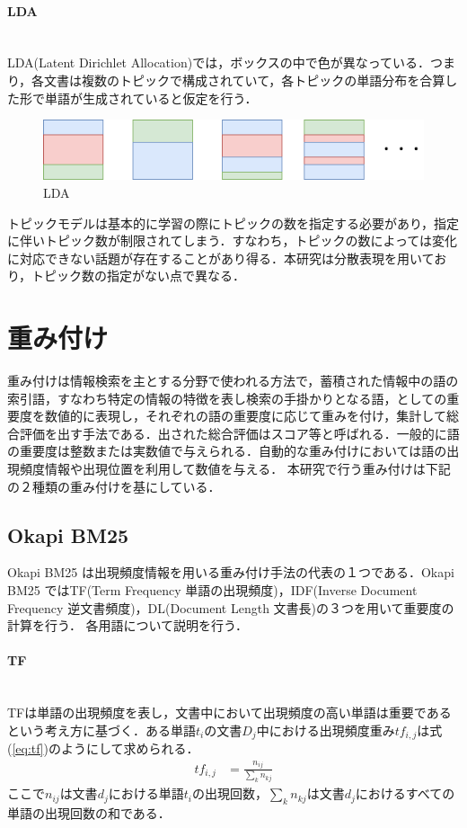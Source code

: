 \paragraph{LDA}\ \\
LDA(Latent Dirichlet Allocation)では，ボックスの中で色が異なっている．つまり，各文書は複数のトピックで構成されていて，各トピックの単語分布を合算した形で単語が生成されていると仮定を行う．
\begin{figure}[htbp]
 \begin{center}
  \includegraphics[width=\textwidth]{../images/2.Related_Work/topicModel-LDA.png}
  \caption{LDA}
  \label{Fig:LDA}
  \vspace{-10pt}
 \end{center}
\end{figure}

トピックモデルは基本的に学習の際にトピックの数を指定する必要があり，指定に伴いトピック数が制限されてしまう．すなわち，トピックの数によっては変化に対応できない話題が存在することがあり得る．本研究は分散表現を用いており，トピック数の指定がない点で異なる．
\section{重み付け}
\label{rel:part:weight}
重み付けは情報検索を主とする分野で使われる方法で，蓄積された情報中の語の索引語，すなわち特定の情報の特徴を表し検索の手掛かりとなる語，としての重要度を数値的に表現し，それぞれの語の重要度に応じて重みを付け，集計して総合評価を出す手法である．出された総合評価はスコア等と呼ばれる．一般的に語の重要度は整数または実数値で与えられる．自動的な重み付けにおいては語の出現頻度情報や出現位置を利用して数値を与える．
本研究で行う重み付けは下記の２種類の重み付けを基にしている．
\subsection{Okapi BM25}
Okapi BM25\cite{okapiBM25} は出現頻度情報を用いる重み付け手法の代表の１つである．Okapi BM25 ではTF(Term Frequency 単語の出現頻度)\cite{tf}，IDF(Inverse Document Frequency 逆文書頻度)\cite{idf}，DL(Document Length 文書長)の３つを用いて重要度の計算を行う．
各用語について説明を行う．
\paragraph{TF}\ \\
TFは単語の出現頻度を表し，文書中において出現頻度の高い単語は重要であるという考え方に基づく．ある単語$t_i$の文書$D_j$中における出現頻度重み$tf_{i,j}$は式(\ref{eq:tf})のようにして求められる．
\begin{equation}
\begin{aligned}
\label{eq:tf}
tf_{i,j} & = \frac{n_{ij}}{ \sum_{k} n_{kj} }
\end{aligned}
\end{equation}
ここで$n_{ij}$は文書$d_{j}$における単語$t_{i}$の出現回数，$\sum _{k} n_{kj} $は文書$d_{j}$におけるすべての単語の出現回数の和である．
